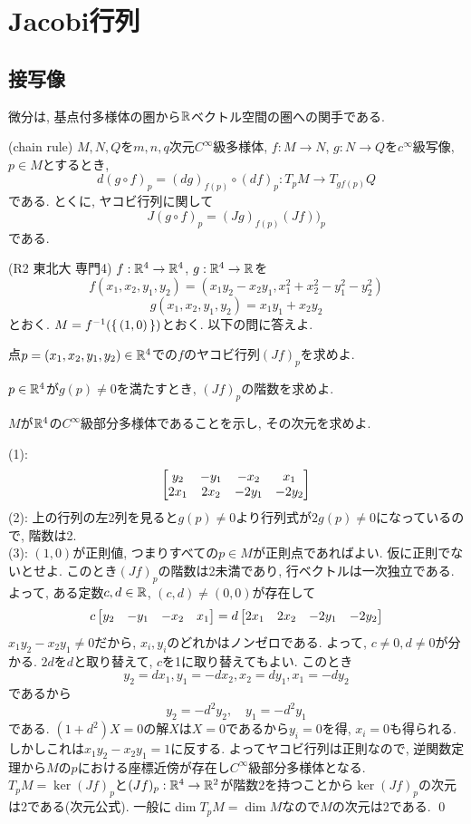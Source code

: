 \section{Jacobi行列}

\subsection{接写像}
微分は, 基点付多様体の圏から$\mathbb{R}$ベクトル空間の圏への関手である.
\begin{theo} (chain rule) $M,N,Q$を$m,n,q$次元$C^{\infty}$級多様体, $f:M\to N$, $g:N\to Q$を$c^{\infty}$級写像, $p\in M$とするとき,
\[d(g\circ f)_{p} = (dg)_{f(p)}\circ (df)_{p} : T_{p}M\to T_{gf(p)}Q\]
である. とくに, ヤコビ行列に関して
\[J(g\circ f)_{p} = (Jg)_{f(p)}(Jf))_{p}\]
である.
\end{theo}

\begin{egprob} (R2 東北大 専門4)
$f:\mathbb{R}^4 \to \mathbb{R}^4$, $g:\mathbb{R}^4\to \mathbb{R}$を
\[f(x_1,x_2,y_1,y_2) = (x_1y_2 - x_2y_1, x_1^2 + x_2^2 - y_1^2 - y_2^2)\]
\[g(x_1,x_2,y_1,y_2) = x_1y_1 + x_2y_2\]
とおく. $M=f^{-1}(\set{(1,0)})$とおく. 以下の問に答えよ.
\ben
\item 点$p = (x_1,x_2,y_1,y_2)\in \mathbb{R}^4$での$f$のヤコビ行列$(Jf)_p$を求めよ.
\item $p\in \mathbb{R}^4$が$g(p) \neq 0$を満たすとき, $(Jf)_p$の階数を求めよ.
\item $M$が$\mathbb{R}^4$の$C^{\infty}$級部分多様体であることを示し, その次元を求めよ.
\een
\end{egprob}
\begin{egans}
(1):
\[
\begin{bmatrix}
y_2 & -y_1 & -x_2 & x_1 \\
2x_1 & 2x_2 & -2y_1 & -2y_2
\end{bmatrix}
\]
(2): 上の行列の左2列を見ると$g(p)\neq 0$より行列式が$2g(p) \neq 0$になっているので, 階数は2. \\
(3): $(1,0)$が正則値, つまりすべての$p\in M$が正則点であればよい. 仮に正則でないとせよ. このとき$(Jf)_p$の階数は2未満であり, 行ベクトルは一次独立である. よって, ある定数$c,d\in \mathbb{R}$, $(c,d)\neq (0,0)$が存在して
\[c\begin{bmatrix}y_2 & -y_1 & -x_2 & x_1\end{bmatrix} = d\begin{bmatrix}2x_1 & 2x_2 & -2y_1 & -2y_2\end{bmatrix}\]
$x_1y_2 - x_2y_1 \neq 0$だから, $x_i,y_i$のどれかはノンゼロである. よって, $c\neq 0, d\neq 0$が分かる. $2d$を$d$と取り替えて, $c$を1に取り替えてもよい. このとき
\[y_2 = dx_1, y_1 = -dx_2, x_2 = dy_1, x_1 = -dy_2\]
であるから
\[y_2 = -d^2y_2,\quad y_1 = -d^2 y_1\]
である. $(1+d^2)X = 0$の解$X$は$X=0$であるから$y_i = 0$を得, $x_i = 0$も得られる. しかしこれは$x_1y_2 - x_2y_1 = 1$に反する. よってヤコビ行列は正則なので, 逆関数定理から$M$の$p$における座標近傍が存在し$C^{\infty}$級部分多様体となる. $T_{p}M = \ker{(Jf)_{p}}$と$(Jf)_{p}: \mathbb{R}^4 \to \mathbb{R}^2$が階数2を持つことから$\ker{(Jf)_{p}}$の次元は2である(次元公式). 一般に$\dim{T_p M} = \dim M$なので$M$の次元は2である. \qed
\end{egans}




